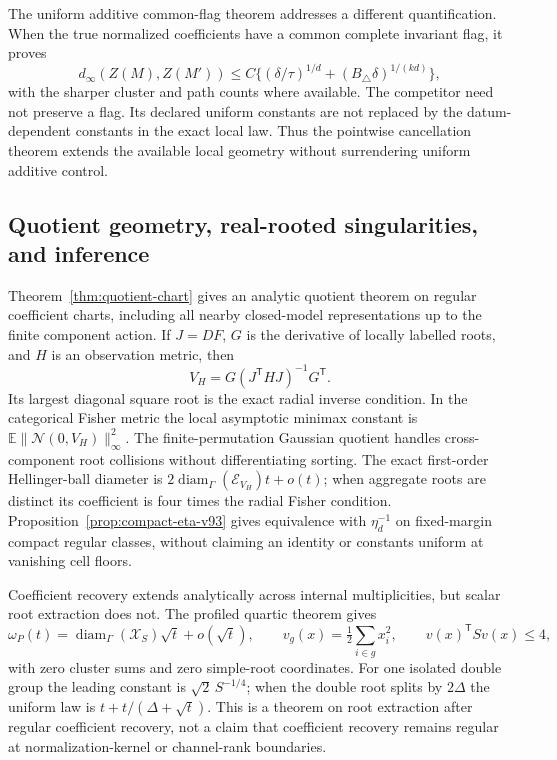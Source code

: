 \documentclass[11pt,reqno]{amsart}
\numberwithin{equation}{section}
\theoremstyle{definition}\newtheorem{definition}[theorem]{Definition}
\theoremstyle{remark}\newtheorem{remark}[theorem]{Remark}
\newcommand{\E}{\mathbb E}
\newcommand{\diam}{\operatorname{diam}}
\begin{document}
The uniform additive common-flag theorem addresses a different
quantification. When the true normalized coefficients have a common
complete invariant flag, it proves
\[
 d_\infty(Z(M),Z(M'))\le C\{(\delta/\tau)^{1/d}
                            +(B_\triangle\delta)^{1/(kd)}\},
\]
with the sharper cluster and path counts where available. The
competitor need not preserve a flag. Its declared uniform constants
are not replaced by the datum-dependent constants in the exact local
law. Thus the pointwise cancellation theorem extends the available
local geometry without surrendering uniform additive control.

\subsection{Quotient geometry, real-rooted singularities, and inference}
Theorem~\ref{thm:quotient-chart} gives an analytic quotient theorem on
regular coefficient charts, including all nearby closed-model
representations up to the finite component action. If $J=DF$, $G$ is
the derivative of locally labelled roots, and $H$ is an observation
metric, then
\[
 V_H=G(J^{\mathsf T}HJ)^{-1}G^{\mathsf T}.
\]
Its largest diagonal square root is the exact radial inverse condition.
In the categorical Fisher metric the local asymptotic minimax constant
is $\E\|\mathcal N(0,V_H)\|_\infty^2$. The finite-permutation Gaussian
quotient handles cross-component root collisions without differentiating
sorting. The exact first-order Hellinger-ball diameter is
$2\diam_\Gamma(\mathcal E_{V_H})t+o(t)$; when aggregate roots are
distinct its coefficient is four times the radial Fisher condition.
Proposition~\ref{prop:compact-eta-v93} gives equivalence with
$\eta_d^{-1}$ on fixed-margin compact regular classes, without claiming
an identity or constants uniform at vanishing cell floors.

Coefficient recovery extends analytically across internal
multiplicities, but scalar root extraction does not. The profiled
quartic theorem gives
\[
 \omega_P(t)=\diam_\Gamma(\mathcal X_S)\sqrt t+o(\sqrt t),
 \qquad v_g(x)=\tfrac12\sum_{i\in g}x_i^2,
 \qquad v(x)^{\mathsf T}Sv(x)\le4,
\]
with zero cluster sums and zero simple-root coordinates. For one
isolated double group the leading constant is $\sqrt2\,S^{-1/4}$;
when the double root splits by $2\Delta$ the uniform law is
$t+t/(\Delta+\sqrt t)$. This is a theorem on root extraction after
regular coefficient recovery, not a claim that coefficient recovery
remains regular at normalization-kernel or channel-rank boundaries.
\end{document}
